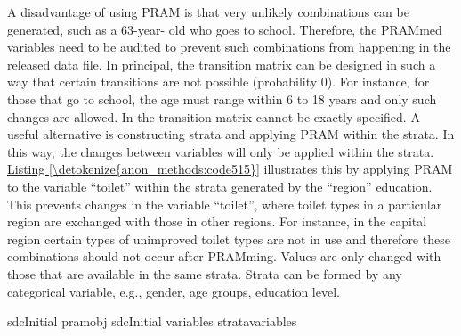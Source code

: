 \documentclass[letterpaper,10pt,english]{sphinxmanual}
\begin{document}
A disadvantage of using PRAM is that very unlikely combinations can be
generated, such as a 63-year- old who goes to school. Therefore, the
PRAMmed variables need to be audited to prevent such combinations from
happening in the released data file. In principal, the transition matrix
can be designed in such a way that certain transitions are not possible
(probability 0). For instance, for those that go to school, the age must
range within 6 to 18 years and only such changes are allowed. In
 the transition matrix cannot be exactly specified. A useful
alternative is constructing strata and applying PRAM within the strata.
In this way, the changes between variables will only be applied within
the strata. \hyperref[\detokenize{anon_methods:code515}]{Listing \ref{\detokenize{anon_methods:code515}}} illustrates this by applying PRAM to the
variable “toilet” within the strata generated by the “region” education.
This prevents changes in the variable “toilet”, where toilet types in a
particular region are exchanged with those in other regions. For
instance, in the capital region certain types of unimproved toilet types
are not in use and therefore these combinations should not occur after
PRAMming. Values are only changed with those that are available in the
same strata. Strata can be formed by any categorical variable, e.g.,
gender, age groups, education level.

\def\sphinxLiteralBlockLabel{\label{\detokenize{anon_methods:code515}}}
%
\begin{sphinxVerbatim}[commandchars=\\\{\},numbers=left,firstnumber=1,stepnumber=1]
 sdcInitial  pramobj  sdcInitial variables   strata\PYGZus{}variables  
\end{sphinxVerbatim}
\end{document}
